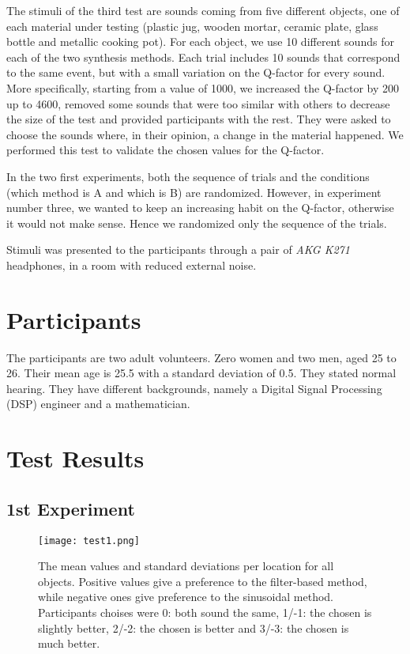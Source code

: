 The stimuli of the third test are sounds coming from five different objects, one of each material under testing (plastic jug, wooden mortar, ceramic plate, glass bottle and metallic cooking pot). For each object, we use 10 different sounds for each of the two synthesis methods. Each trial includes 10 sounds that correspond to the same event, but with a small variation on the Q-factor for every sound. More specifically, starting from a value of 1000, we increased the Q-factor by 200 up to 4600, removed some sounds that were too similar with others to decrease the size of the test and provided participants with the rest. They were asked to choose the sounds where, in their opinion, a change in the material happened. We performed this test to validate the chosen values for the Q-factor.

In the two first experiments, both the sequence of trials and the conditions (which method is A and which is B) are randomized. However, in experiment number three, we wanted to keep an increasing habit on the Q-factor, otherwise it would not make sense. Hence we randomized only the sequence of the trials.

Stimuli was presented to the participants through a pair of \textit{AKG K271} headphones\done{}, in a room with reduced external noise.

\section{Participants}
The participants are two adult volunteers. Zero women and two men, aged 25 to 26. Their mean age is 25.5 with a standard deviation of 0.5. They stated normal hearing. They have different backgrounds, namely a Digital Signal Processing (DSP) engineer and a mathematician.

\section{Test Results}

\subsection{1st Experiment}

\begin{figure}[H]
  \centering
    \texttt{[image: test1.png]}
      \caption{The mean values and standard deviations per location for all objects. Positive values give a preference to the filter-based method, while negative ones give preference to the sinusoidal method. Participants choises were 0: both sound the same, 1/-1: the chosen is slightly better, 2/-2: the chosen is better and 3/-3: the chosen is much better.}\label{fig:means}
\end{figure}

